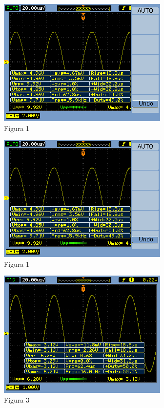 \documentclass[a4paper]{article} %
\begin{document}
\begin{figure}
\begin{centering}
\includegraphics{Imagens/1}\caption{Figura 1 \label{fig:Fig-1}}
\par\end{centering}
\end{figure}

\begin{figure}
\begin{centering}
\includegraphics{Imagens/1}\caption{Figura 1 \label{fig:Fig-1}}
\par\end{centering}
\end{figure}

\begin{figure}
\begin{centering}
\includegraphics{Imagens/3}\caption{Figura 3 \label{fig:Fig-3}}
\par\end{centering}
\end{figure}
\end{document}
